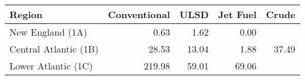 \begin{tabular}{lrrrr}
  \hline
Region & Conventional & ULSD & Jet Fuel & Crude \\ 
  \hline
New England (1A) & 0.63 & 1.62 & 0.00 &  \\ 
  Central Atlantic (1B) & 28.53 & 13.04 & 1.88 & 37.49 \\ 
  Lower Atlantic (1C) & 219.98 & 59.01 & 69.06 &  \\ 
   \hline
\end{tabular}
